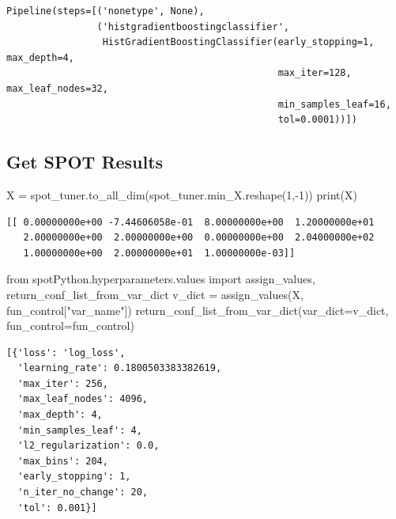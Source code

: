 \documentclass[
  letterpaper,
  DIV=11,
  numbers=noendperiod]{scrreprt}
\newenvironment{Shaded}{\begin{snugshade}}{\end{snugshade}}
\newcommand{\BuiltInTok}[1]{\textcolor[rgb]{0.00,0.23,0.31}{#1}}
\newcommand{\DecValTok}[1]{\textcolor[rgb]{0.68,0.00,0.00}{#1}}
\newcommand{\ImportTok}[1]{\textcolor[rgb]{0.00,0.46,0.62}{#1}}
\newcommand{\NormalTok}[1]{\textcolor[rgb]{0.00,0.23,0.31}{#1}}
\newcommand{\OperatorTok}[1]{\textcolor[rgb]{0.37,0.37,0.37}{#1}}
\newcommand{\StringTok}[1]{\textcolor[rgb]{0.13,0.47,0.30}{#1}}
\begin{document}
\begin{verbatim}
Pipeline(steps=[('nonetype', None),
                ('histgradientboostingclassifier',
                 HistGradientBoostingClassifier(early_stopping=1, max_depth=4,
                                                max_iter=128, max_leaf_nodes=32,
                                                min_samples_leaf=16,
                                                tol=0.0001))])
\end{verbatim}

\hypertarget{get-spot-results-2}{%
\subsection{Get SPOT Results}\label{get-spot-results-2}}

\begin{Shaded}
\begin{Highlighting}[]
\NormalTok{X }\OperatorTok{=}\NormalTok{ spot\_tuner.to\_all\_dim(spot\_tuner.min\_X.reshape(}\DecValTok{1}\NormalTok{,}\OperatorTok{{-}}\DecValTok{1}\NormalTok{))}
\BuiltInTok{print}\NormalTok{(X)}
\end{Highlighting}
\end{Shaded}

\begin{verbatim}
[[ 0.00000000e+00 -7.44606058e-01  8.00000000e+00  1.20000000e+01
   2.00000000e+00  2.00000000e+00  0.00000000e+00  2.04000000e+02
   1.00000000e+00  2.00000000e+01  1.00000000e-03]]
\end{verbatim}

\begin{Shaded}
\begin{Highlighting}[]
\ImportTok{from}\NormalTok{ spotPython.hyperparameters.values }\ImportTok{import}\NormalTok{ assign\_values, return\_conf\_list\_from\_var\_dict}
\NormalTok{v\_dict }\OperatorTok{=}\NormalTok{ assign\_values(X, fun\_control[}\StringTok{"var\_name"}\NormalTok{])}
\NormalTok{return\_conf\_list\_from\_var\_dict(var\_dict}\OperatorTok{=}\NormalTok{v\_dict, fun\_control}\OperatorTok{=}\NormalTok{fun\_control)}
\end{Highlighting}
\end{Shaded}

\begin{verbatim}
[{'loss': 'log_loss',
  'learning_rate': 0.1800503383382619,
  'max_iter': 256,
  'max_leaf_nodes': 4096,
  'max_depth': 4,
  'min_samples_leaf': 4,
  'l2_regularization': 0.0,
  'max_bins': 204,
  'early_stopping': 1,
  'n_iter_no_change': 20,
  'tol': 0.001}]
\end{verbatim}
\end{document}
